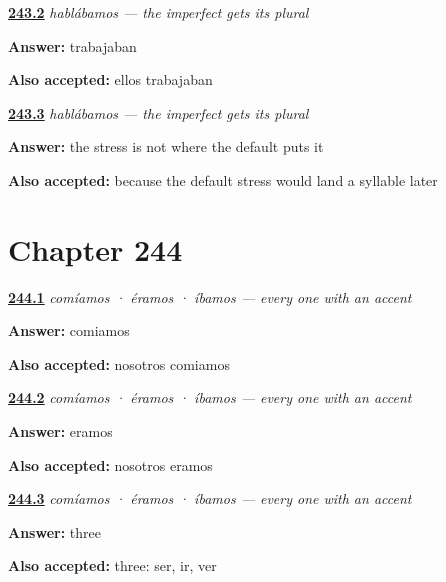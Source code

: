 \noindent\begin{minipage}[t]{\linewidth}
\raggedright
\hyperlink{review-ES-C63-hablabamos-they}{\textbf{243.2}} \emph{hablábamos — the imperfect gets its plural}\par
\small \textbf{Answer:} trabajaban\par
\footnotesize \textbf{Also accepted:} ellos trabajaban
\end{minipage}\par\medskip

\noindent\begin{minipage}[t]{\linewidth}
\raggedright
\hyperlink{review-ES-C63-hablabamos-accent}{\textbf{243.3}} \emph{hablábamos — the imperfect gets its plural}\par
\small \textbf{Answer:} the stress is not where the default puts it\par
\footnotesize \textbf{Also accepted:} because the default stress would land a syllable later
\end{minipage}\par\medskip

\section*{Chapter 244}

\noindent\begin{minipage}[t]{\linewidth}
\raggedright
\hyperlink{review-ES-C63-comiamos-we}{\textbf{244.1}} \emph{comíamos · éramos · íbamos — every one with an accent}\par
\small \textbf{Answer:} comiamos\par
\footnotesize \textbf{Also accepted:} nosotros comiamos
\end{minipage}\par\medskip

\noindent\begin{minipage}[t]{\linewidth}
\raggedright
\hyperlink{review-ES-C63-comiamos-ser}{\textbf{244.2}} \emph{comíamos · éramos · íbamos — every one with an accent}\par
\small \textbf{Answer:} eramos\par
\footnotesize \textbf{Also accepted:} nosotros eramos
\end{minipage}\par\medskip

\noindent\begin{minipage}[t]{\linewidth}
\raggedright
\hyperlink{review-ES-C63-comiamos-count}{\textbf{244.3}} \emph{comíamos · éramos · íbamos — every one with an accent}\par
\small \textbf{Answer:} three\par
\footnotesize \textbf{Also accepted:} three: ser, ir, ver
\end{minipage}\par\medskip

